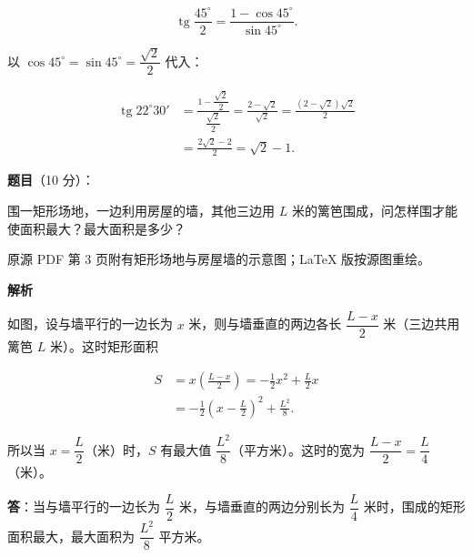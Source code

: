 \begin{answer}
\nopagebreak[4]
\[
\operatorname{tg}\frac{45^\circ}{2}
=\frac{1-\cos45^\circ}{\sin45^\circ}.
\]

以 $\cos45^\circ=\sin45^\circ=\dfrac{\sqrt2}{2}$ 代入：

\nopagebreak[4]
\[
\begin{aligned}
\operatorname{tg}22^\circ30'
&=\frac{1-\dfrac{\sqrt2}{2}}{\dfrac{\sqrt2}{2}}
=\frac{2-\sqrt2}{\sqrt2}
=\frac{(2-\sqrt2)\sqrt2}{2}\\
&=\frac{2\sqrt2-2}{2}
=\sqrt2-1.
\end{aligned}
\]









\end{answer}
\begin{answer}

\textbf{题目}（10 分）：

围一矩形场地，一边利用房屋的墙，其他三边用 $L$ 米的篱笆围成，问怎样围才能使面积最大？最大面积是多少？

\begin{gktip}
原源 PDF 第 3 页附有矩形场地与房屋墙的示意图；LaTeX 版按源图重绘。
\end{gktip}
\nopagebreak[4]
\begin{center}\end{center}
\nopagebreak[4]
\textbf{解析}

如图，设与墙平行的一边长为 $x$ 米，则与墙垂直的两边各长 $\dfrac{L-x}{2}$ 米（三边共用篱笆 $L$ 米）。这时矩形面积
\nopagebreak[4]
\begin{center}\end{center}
\nopagebreak[4]
\nopagebreak[4]
\[
\begin{aligned}
S&=x\left(\frac{L-x}{2}\right)
=-\frac12x^2+\frac L2x\\
&=-\frac12\left(x-\frac L2\right)^2+\frac{L^2}{8}.
\end{aligned}
\]

所以当 $x=\dfrac L2$（米）时，$S$ 有最大值 $\dfrac{L^2}{8}$（平方米）。这时的宽为 $\dfrac{L-x}{2}=\dfrac L4$（米）。

\textbf{答}：当与墙平行的一边长为 $\dfrac L2$ 米，与墙垂直的两边分别长为 $\dfrac L4$ 米时，围成的矩形面积最大，最大面积为 $\dfrac{L^2}{8}$ 平方米。


\end{answer}
